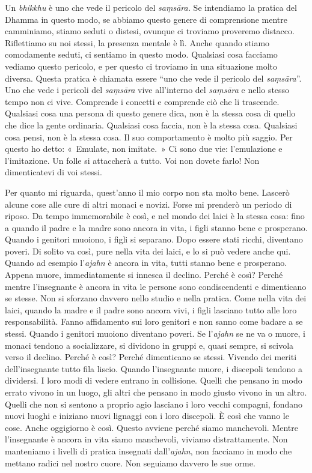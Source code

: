 Un \emph{bhikkhu} è uno che vede il pericolo del \emph{saṃsāra.} Se
intendiamo la pratica del Dhamma in questo modo, se abbiamo questo
genere di comprensione mentre camminiamo, stiamo seduti o distesi,
ovunque ci troviamo proveremo distacco. Riflettiamo su noi stessi, la
presenza mentale è lì. Anche quando stiamo comodamente seduti, ci
sentiamo in questo modo. Qualsiasi cosa facciamo vediamo questo
pericolo, e per questo ci troviamo in una situazione molto diversa.
Questa pratica è chiamata essere ``uno che vede il pericolo del
\emph{saṃsāra}''. Uno che vede i pericoli del \emph{saṃsāra} vive
all'interno del \emph{saṃsāra} e nello stesso tempo non ci vive.
Comprende i concetti e comprende ciò che li trascende. Qualsiasi cosa
una persona di questo genere dica, non è la stessa cosa di quello che
dice la gente ordinaria. Qualsiasi cosa faccia, non è la stessa cosa.
Qualsiasi cosa pensi, non è la stessa cosa. Il suo comportamento è molto
più saggio. Per questo ho detto: «~Emulate, non imitate.~» Ci sono due
vie: l'emulazione e l'imitazione. Un folle si attaccherà a tutto. Voi
non dovete farlo! Non dimenticatevi di voi stessi.

Per quanto mi riguarda, quest'anno il mio corpo non sta molto bene.
Lascerò alcune cose alle cure di altri monaci e novizi. Forse mi
prenderò un periodo di riposo. Da tempo immemorabile è così, e nel mondo
dei laici è la stessa cosa: fino a quando il padre e la madre sono
ancora in vita, i figli stanno bene e prosperano. Quando i genitori
muoiono, i figli si separano. Dopo essere stati ricchi, diventano
poveri. Di solito va così, pure nella vita dei laici, e lo si può vedere
anche qui. Quando ad esempio l'\emph{ajahn} è ancora in vita, tutti
stanno bene e prosperano. Appena muore, immediatamente si innesca il
declino. Perché è così? Perché mentre l'insegnante è ancora in vita le
persone sono condiscendenti e dimenticano se stesse. Non si sforzano
davvero nello studio e nella pratica. Come nella vita dei laici, quando
la madre e il padre sono ancora vivi, i figli lasciano tutto alle loro
responsabilità. Fanno affidamento sui loro genitori e non sanno come
badare a se stessi. Quando i genitori muoiono diventano poveri. Se
l'\emph{ajahn} se ne va o muore, i monaci tendono a socializzare, si
dividono in gruppi e, quasi sempre, si scivola verso il declino. Perché
è così? Perché dimenticano se stessi. Vivendo dei meriti dell'insegnante
tutto fila liscio. Quando l'insegnante muore, i discepoli tendono a
dividersi. I loro modi di vedere entrano in collisione. Quelli che
pensano in modo errato vivono in un luogo, gli altri che pensano in modo
giusto vivono in un altro. Quelli che non si sentono a proprio agio
lasciano i loro vecchi compagni, fondano nuovi luoghi e iniziano nuovi
lignaggi con i loro discepoli. È così che vanno le cose. Anche
oggigiorno è così. Questo avviene perché siamo manchevoli. Mentre
l'insegnante è ancora in vita siamo manchevoli, viviamo distrattamente.
Non manteniamo i livelli di pratica insegnati dall'\emph{ajahn}, non
facciamo in modo che mettano radici nel nostro cuore. Non seguiamo
davvero le sue orme.

